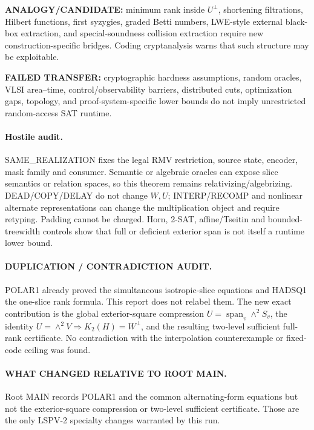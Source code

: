 \documentclass[11pt]{article}
\begin{document}
\textbf{ANALOGY/CANDIDATE:} minimum rank inside \(U^\perp\), shortening filtrations, Hilbert functions, first syzygies, graded Betti numbers, LWE-style external black-box extraction, and special-soundness collision extraction require new construction-specific bridges. Coding cryptanalysis warns that such structure may be exploitable.

\textbf{FAILED TRANSFER:} cryptographic hardness assumptions, random oracles, VLSI area--time, control/observability barriers, distributed cuts, optimization gaps, topology, and proof-system-specific lower bounds do not imply unrestricted random-access SAT runtime.

\paragraph{Hostile audit.}
SAME\_REALIZATION fixes the legal RMV restriction, source state, encoder, mask family and consumer. Semantic or algebraic oracles can expose slice semantics or relation spaces, so this theorem remains relativizing/algebrizing. DEAD/COPY/DELAY do not change \(W,U\); INTERP/RECOMP and nonlinear alternate representations can change the multiplication object and require retyping. Padding cannot be charged. Horn, 2-SAT, affine/Tseitin and bounded-treewidth controls show that full or deficient exterior span is not itself a runtime lower bound.

\paragraph{DUPLICATION / CONTRADICTION AUDIT.}
POLAR1 already proved the simultaneous isotropic-slice equations and HADSQ1 the one-slice rank formula. This report does not relabel them. The new exact contribution is the global exterior-square compression \(U=\operatorname{span}_v\wedge^2S_v\), the identity \(U=\wedge^2V\Rightarrow K_2(H)=W^\perp\), and the resulting two-level sufficient full-rank certificate. No contradiction with the interpolation counterexample or fixed-code ceiling was found.

\paragraph{WHAT CHANGED RELATIVE TO ROOT MAIN.}
Root MAIN records POLAR1 and the common alternating-form equations but not the exterior-square compression or two-level sufficient certificate. Those are the only LSPV-2 specialty changes warranted by this run.
\end{document}
